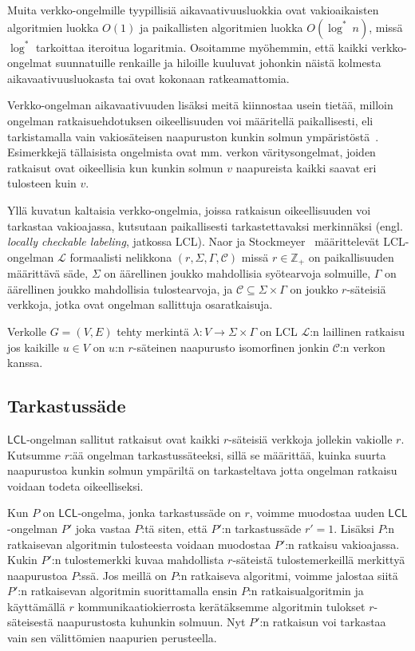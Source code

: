 \documentclass[12pt,finnish]{tktltiki2}
\theoremstyle{definition}
\theoremstyle{remark}
\newcommand*{\lcl}{\ensuremath{\mathsf{LCL}}}
\begin{document}
Muita verkko-ongelmille tyypillisiä aikavaativuusluokkia ovat vakioaikaisten algoritmien luokka $O(1)$ ja paikallisten algoritmien luokka $O(\log^*\ n)$, missä $\log^*$ tarkoittaa iteroitua logaritmia. Osoitamme myöhemmin, että kaikki verkko-ongelmat suunnatuille renkaille ja hiloille kuuluvat johonkin näistä kolmesta aikavaativuusluokasta tai ovat kokonaan ratkeamattomia.

Verkko-ongelman aikavaativuuden lisäksi meitä kiinnostaa usein tietää, milloin ongelman ratkaisuehdotuksen oikeellisuuden voi määritellä paikallisesti, eli tarkistamalla vain vakiosäteisen naapuruston kunkin solmun ympäristöstä~\cite{linial92}. Esimerkkejä tällaisista ongelmista ovat mm. verkon väritysongelmat, joiden ratkaisut ovat oikeellisia kun kunkin solmun $v$ naapureista kaikki saavat eri tulosteen kuin $v$.

Yllä kuvatun kaltaisia verkko-ongelmia, joissa ratkaisun oikeellisuuden voi tarkastaa vakioajassa, kutsutaan paikallisesti tarkastettavaksi merkinnäksi (engl. \textit{locally checkable labeling}, jatkossa LCL). Naor ja Stockmeyer~\cite{naor95} määrittelevät LCL-ongelman $\mathcal{L}$ formaalisti nelikkona $(r, \Sigma, \Gamma, \mathcal{C})$ missä $r \in \mathbb{Z}_+$ on paikallisuuden määrittävä säde, $\Sigma$ on äärellinen joukko mahdollisia syötearvoja solmuille, $\Gamma$ on äärellinen joukko mahdollisia tulostearvoja, ja $\mathcal{C} \subseteq \Sigma \times \Gamma$ on joukko $r$-säteisiä verkkoja, jotka ovat ongelman sallittuja osaratkaisuja.


Verkolle $G = (V, E)$ tehty merkintä $\lambda : V \rightarrow \Sigma \times \Gamma$ on LCL $\mathcal{L}$:n laillinen ratkaisu jos kaikille $u \in V$ on $u$:n $r$-säteinen naapurusto isomorfinen jonkin $\mathcal{C}$:n verkon kanssa.

\subsection{Tarkastussäde}
\lcl -ongelman sallitut ratkaisut ovat kaikki $r$-säteisiä verkkoja jollekin vakiolle $r$. Kutsumme $r$:ää ongelman tarkastussäteeksi, sillä se määrittää, kuinka suurta naapurustoa kunkin solmun ympäriltä on tarkasteltava jotta ongelman ratkaisu voidaan todeta oikeelliseksi.

Kun $P$ on \lcl -ongelma, jonka tarkastussäde on $r$, voimme muodostaa uuden \lcl -ongelman $P'$ joka vastaa $P$:tä siten, että $P'$:n tarkastussäde $r' = 1$. Lisäksi $P$:n ratkaisevan algoritmin tulosteesta voidaan muodostaa $P'$:n ratkaisu vakioajassa. Kukin $P'$:n tulostemerkki kuvaa mahdollista $r$-säteistä tulostemerkeillä merkittyä naapurustoa $P$:ssä. Jos meillä on $P$:n ratkaiseva algoritmi, voimme jalostaa siitä $P'$:n ratkaisevan algoritmin suorittamalla ensin $P$:n ratkaisualgoritmin ja käyttämällä $r$ kommunikaatiokierrosta kerätäksemme algoritmin tulokset $r$-säteisestä naapurustosta kuhunkin solmuun. Nyt $P'$:n ratkaisun voi tarkastaa vain sen välittömien naapurien perusteella.
\end{document}
